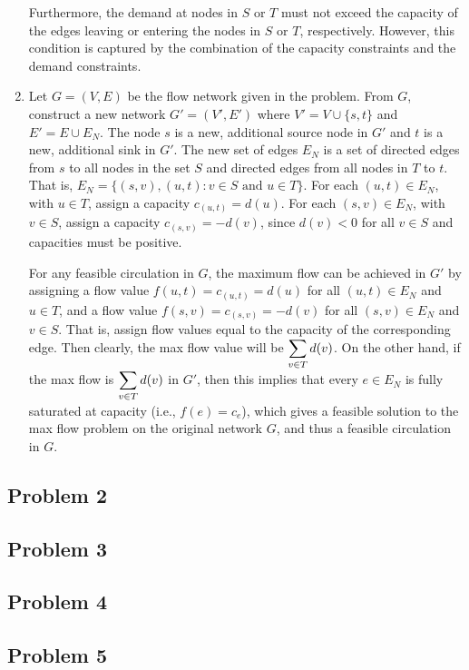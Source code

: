 \documentclass[twoside,11pt]{homework}
\begin{document}
\begin{enumerate}[\bf i.]
Furthermore,  the demand at nodes in $S$ or $T$ must not exceed the capacity of the edges leaving or entering the nodes in $S$ or $T$, respectively.   However, this condition is captured by the combination of the capacity constraints and the demand constraints. 

\item Let $G = (V, E)$ be the flow network given in the problem.  From $G$, construct a new network  $G' = (V', E')$ where $V' = V \cup \{s, t\}$ and $E' = E \cup E_{N}$.  The node $s$ is a new, additional source node in $G'$ and $t$ is a new,  additional sink in $G'$.  The new set of edges $E_{N}$ is a set of directed edges from $s$ to all nodes in the set $S$ and directed edges from all nodes in $T$ to $t$.  That is,  $E_{N} = \{(s, v),  (u, t) : v \in S \textrm{ and } u \in T\}$.  For each $(u, t) \in E_{N}$, with  $u \in T$,  assign a capacity $c_{(u, t)} = d(u)$.  For each $(s, v) \in E_{N}$,  with $v \in S$,  assign a capacity $c_{(s, v)} = -d(v)$,  since $d(v) < 0$ for all $v \in S$ and capacities must be positive.  

For any feasible circulation in $G$, the maximum flow can be achieved in $G'$ by assigning a flow value $f(u, t) = c_{(u, t)} = d(u)$ for all $ (u, t) \in E_{N} $ and $u \in T$, and a flow value $f(s, v) = c_{(s, v)} = -d(v)$ for all $(s, v) \in E_{N}$ and $v \in S$.  That is, assign flow values equal to the capacity of the corresponding edge.  Then clearly, the max flow value will be $\mathlarger{\sum_{v \in T} d(v)}$.  On the other hand, if the max flow is $\mathlarger{\sum_{v \in T} d(v)}$ in $G'$,  then this implies that every $e \in E_{N}$ is fully saturated at capacity (i.e., $f(e) = c_e$), which gives a feasible  solution to the max flow problem on the original network $G$, and thus a feasible circulation in $G$.

\end{enumerate}


\subsection*{Problem 2}





\subsection*{Problem 3}





\subsection*{Problem 4}





\subsection*{Problem 5}
\end{document}
